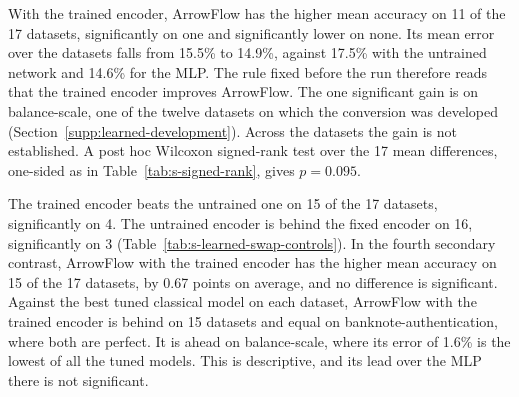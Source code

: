 


With the trained encoder, ArrowFlow has the higher mean accuracy on 11 of the 17 datasets, significantly on one and significantly lower on none. Its mean error over the datasets falls from 15.5\% to 14.9\%, against 17.5\% with the untrained network and 14.6\% for the MLP. The rule fixed before the run therefore reads that the trained encoder improves ArrowFlow. The one significant gain is on balance-scale, one of the twelve datasets on which the conversion was developed (Section~\ref{supp:learned-development}). Across the datasets the gain is not established. A post hoc Wilcoxon signed-rank test over the 17 mean differences, one-sided as in Table~\ref{tab:s-signed-rank}, gives $p=0.095$.

The trained encoder beats the untrained one on 15 of the 17 datasets, significantly on 4. The untrained encoder is behind the fixed encoder on 16, significantly on 3 (Table~\ref{tab:s-learned-swap-controls}). In the fourth secondary contrast, ArrowFlow with the trained encoder has the higher mean accuracy on 15 of the 17 datasets, by 0.67 points on average, and no difference is significant. Against the best tuned classical model on each dataset, ArrowFlow with the trained encoder is behind on 15 datasets and equal on banknote-authentication, where both are perfect. It is ahead on balance-scale, where its error of 1.6\% is the lowest of all the tuned models. This is descriptive, and its lead over the MLP there is not significant.
